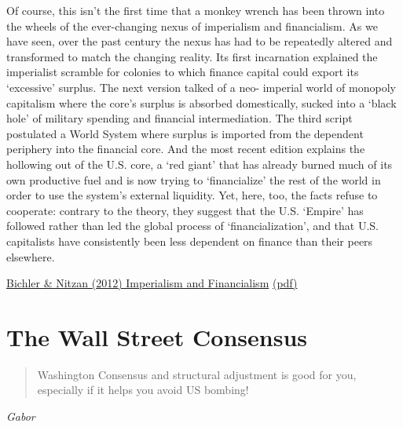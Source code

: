 \documentclass[
]{book}
\begin{document}
Of course, this isn't the first time that a monkey wrench has been thrown into the wheels
of the ever-changing nexus of imperialism and financialism. As we have seen, over the past
century the nexus has had to be repeatedly altered and transformed to match the
changing reality. Its first incarnation explained the imperialist scramble for colonies to
which finance capital could export its `excessive' surplus. The next version talked of a neo-
imperial world of monopoly capitalism where the core's surplus is absorbed domestically,
sucked into a `black hole' of military spending and financial intermediation. The third
script postulated a World System where surplus is imported from the dependent
periphery into the financial core. And the most recent edition explains the hollowing out
of the U.S. core, a `red giant' that has already burned much of its own productive fuel and
is now trying to `financialize' the rest of the world in order to use the system's external
liquidity.
Yet, here, too, the facts refuse to cooperate: contrary to the theory, they suggest
that the U.S. `Empire' has followed rather than led the global process of `financialization',
and that U.S. capitalists have consistently been less dependent on finance than their peers
elsewhere.

\href{http://bnarchives.yorku.ca/329/}{Bichler \& Nitzan (2012) Imperialism and Financialism}
\href{pdf/Bichler_Nitzan_2012_Imperialism_and_Financialism.pdf}{(pdf)}

\hypertarget{the-wall-street-consensus-1}{%
\chapter{The Wall Street Consensus}\label{the-wall-street-consensus-1}}

\begin{quote}
Washington Consensus and structural adjustment is good for you,
especially if it helps you avoid US bombing!
\end{quote}

\emph{Gabor}
\end{document}
